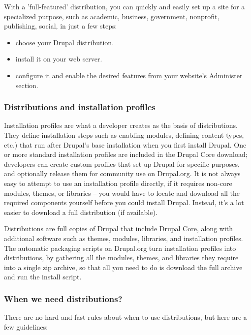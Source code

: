 With a 'full-featured' distribution, you can quickly and easily set up a site for a specialized purpose, such as academic, business, government, nonprofit, publishing, social, in just a few steps:

\begin{itemize}
	\item choose your Drupal distribution.
	\item install it on your web server.
	\item configure it and enable the desired features from your website's Administer section.
\end{itemize}

\subsubsection{Distributions and installation profiles}

Installation profiles are what a developer creates as the basis of distributions. They define installation steps such as enabling modules, defining content types, etc.) that run after Drupal's base installation when you first install Drupal. One or more standard installation profiles are included in the Drupal Core download; developers can create custom profiles that set up Drupal for specific purposes, and optionally release them for community use on Drupal.org. It is not always easy to attempt to use an installation profile directly, if it requires non-core modules, themes, or libraries -- you would have to locate and download all the required components yourself before you could install Drupal. Instead, it's a lot easier to download a full distribution (if available).

Distributions are full copies of Drupal that include Drupal Core, along with additional software such as themes, modules, libraries, and installation profiles. The automatic packaging scripts on Drupal.org turn installation profiles into distributions, by gathering all the modules, themes, and libraries they require into a single zip archive, so that all you need to do is download the full archive and run the install script.

\subsubsection{When we need distributions?}

There are no hard and fast rules about when to use distributions, but here are a few guidelines:

